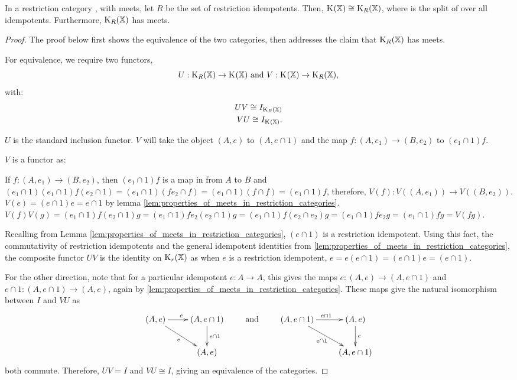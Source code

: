 \begin{proposition}\label{pro:in_rc_x_with_meets_split_x_is_cong_to_split_r_x}
  In a restriction category \X, with meets, let $R$ be the set of restriction idempotents.
  Then, $\text{K}_{}(\mathbb{X}) \cong \text{K}_{R}(\mathbb{X})$, where \spl{}{\X} is the split of \X over all idempotents.
  Furthermore, $\text{K}_{R}(\mathbb{X})$ has meets.
\end{proposition}
\begin{proof}
  The proof below first shows the equivalence of the two categories, then addresses the claim
  that $\text{K}_{R}(\mathbb{X})$ has meets.

  For equivalence, we require two functors,
  \[
    U:\text{K}_{R}(\mathbb{X})\to\text{K}_{}(\mathbb{X})\text{ and }V:\text{K}_{}(\mathbb{X})\to\text{K}_{R}(\mathbb{X}),
  \]
  with:
  \begin{align}
    U V \cong I_{\text{K}_{R}(\mathbb{X})}\\
    V U \cong I_{\text{K}_{}(\mathbb{X})}.
  \end{align}


  $U$ is the standard inclusion functor. $V$ will take the object $(A,e)$ to
  $(A,e\cap 1)$ and the map $f:(A,e_1)\to (B,e_2)$ to $(e_1\cap 1)f $.

  $V$ is a functor as:
  \begin{description}
     If  $f:(A,e_1) \to (B,e_2)$, then
      $(e_1\cap 1) f $ is a map in \X from $A$ to $B$ and
      $ (e_1\cap 1)(e_1\cap 1) f  (e_2 \cap 1) =
      (e_1\cap 1) (f  e_2 \cap f ) = (e_1\cap 1) (f \cap f)= (e_1\cap 1) f$, therefore,
      $V(f):V((A,e_1)) \to V((B,e_2))$.
     $V(e) = (e\cap 1 ) e = e \cap 1$ by
      lemma \ref{lem:properties_of_meets_in_restriction_categories}.
     $V(f) V(g)
      = (e_1\cap 1 ) f (e_2 \cap 1) g
      = (e_1\cap 1 ) f e_2 (e_2 \cap 1) g
      = (e_1\cap 1 ) f  (e_2 \cap e_{2}) g
      = (e_1\cap 1 ) f e_2 g
      = (e_1\cap 1 ) f g
      = V(f g)$.
  \end{description}

  Recalling from Lemma \ref{lem:properties_of_meets_in_restriction_categories}, $(e\cap 1)$
  is a restriction idempotent. Using this fact, the commutativity of restriction idempotents
  and the general idempotent identities from
  \ref{lem:properties_of_meets_in_restriction_categories}, the composite functor $U V$ is
  the identity on $\text{K}_{r}(\mathbb{X})$ as when $e$ is a restriction idempotent,
  $e = e (e\cap 1) = (e\cap 1) e = (e\cap 1)$.

  For the other direction,  note that for a particular idempotent $e:A\to A$,  this gives the
  maps $e:(A,e)\to(A,e\cap 1)$ and $e\cap 1 : (A,e\cap 1) \to (A,e)$, again by
  \ref{lem:properties_of_meets_in_restriction_categories}. These maps give the natural
  isomorphism between $I$ and $V U$ as
  \[
    \xymatrix{
      (A,e)\ar[r]^e \ar[dr]_{e} &(A,e\cap 1)\ar[d]^{e\cap 1}\\
      &(A,e)
    }\qquad \text{ and  }\qquad
    \xymatrix{
      (A,e\cap 1)\ar[r]^{e\cap 1} \ar[dr]_{e\cap 1} &(A,e)\ar[d]^{e}\\
      &(A,e\cap 1)
    }
  \]
  both commute. Therefore, $U V = I$ and $V U \cong I$, giving an equivalence of the categories.


\end{proof}

